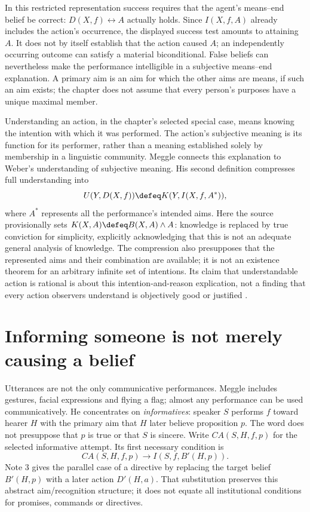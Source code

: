 In this restricted representation success requires that the agent's
means--end belief be correct: \(D(X,f)\leftrightarrow A\) actually
holds. Since \(I(X,f,A)\) already includes the action's occurrence,
the displayed success test amounts to attaining \(A\). It does not
by itself establish that the action caused \(A\); an independently
occurring outcome can satisfy a material biconditional. False beliefs
can nevertheless make the performance intelligible in a subjective
means--end explanation. A primary aim is an aim for which the other
aims are means, if such an aim exists; the chapter does not assume
that every person's purposes have a unique maximal member.

Understanding an action, in the chapter's selected special case, means
knowing the intention with which it was performed. The action's
subjective meaning is its function for its performer, rather than a
meaning established solely by membership in a linguistic community.
Meggle connects this explanation to Weber's understanding of subjective
meaning. His second definition compresses full understanding into
\[
 U(Y,D(X,f))\defeq K(Y,I(X,f,A^*)),
\]
where \(A^*\) represents all the performance's intended aims.
Here the source provisionally sets \(K(X,A)\defeq B(X,A)\land A\):
knowledge is replaced by true conviction for simplicity, explicitly
acknowledging that this is not an adequate general analysis of knowledge.
The compression also presupposes that the represented aims and their
combination are available; it is not an existence theorem for an arbitrary
infinite set of intentions. Its claim that understandable action is
rational is about this intention-and-reason explication, not a finding
that every action observers understand is objectively good or justified
\cite[p.~602]{Meggle2021RationalityCommunication}.

\section{Informing someone is not merely causing a belief}

Utterances are not the only communicative performances. Meggle includes
gestures, facial expressions and flying a flag; almost any performance
can be used communicatively. He concentrates on \emph{informatives}:
speaker \(S\) performs \(f\) toward hearer \(H\) with the primary
aim that \(H\) later believe proposition \(p\). The word does not
presuppose that \(p\) is true or that \(S\) is sincere.
Write \(CA(S,H,f,p)\) for the selected informative attempt. Its first
necessary condition is
\[
 CA(S,H,f,p)\to I(S,f,B'(H,p)).
\]
Note 3 gives the parallel case of a directive by replacing the target
belief \(B'(H,p)\) with a later action \(D'(H,a)\). That substitution
preserves this abstract aim/recognition structure; it does not equate
all institutional conditions for promises, commands or directives.

